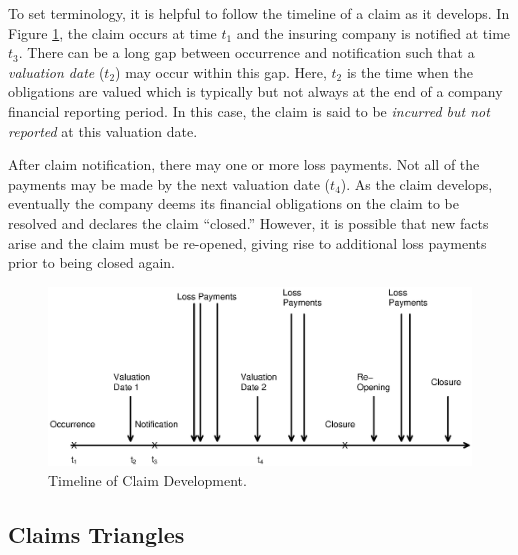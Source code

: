 
To set terminology, it is helpful to follow the timeline of a claim
as it develops. In Figure \ref{F19:TimeLine}, the claim occurs at
time $t_1$ and the insuring company is notified at time $t_3$. There
can be a long gap between occurrence and notification such that a
\emph{valuation date} ($t_2$) may occur within this gap. Here, $t_2$
is the time when the obligations are valued which is typically but
not always at the end of a company financial reporting period. In
this case, the claim is said to be \emph{incurred but not reported}
at this valuation date.

After claim notification, there may one or more loss payments. Not
all of the payments may be made by the next valuation date ($t_4$).
As the claim develops, eventually the company deems its financial
obligations on the claim to be resolved and declares the claim
``closed.'' However, it is possible that new facts arise and the
claim must be re-opened, giving rise to additional loss payments
prior to being closed again.
\begin{figure}[htp]
  \begin{center}
    \includegraphics[width=1\textwidth]{Chapter19Triangles/F19TimeLine.eps}
    \caption{\label{F19:TimeLine} \small Timeline of Claim Development.}
  \end{center}
\end{figure}


\subsection{Claims Triangles}

